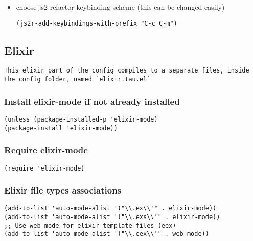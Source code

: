 \documentclass[11pt]{article}
\begin{document}
\begin{itemize}
\item choose js2-refactor keybinding scheme (this can be changed easily)
\label{sec:orgf7a49f5}

\begin{verbatim}
(js2r-add-keybindings-with-prefix "C-c C-m")
\end{verbatim}
\end{itemize}

\subsection*{Elixir}
\label{sec:orgfc30dfa}

\begin{verbatim}
This elixir part of the config compiles to a separate files, inside the config folder, named `elixir.tau.el`
\end{verbatim}

\subsubsection*{Install elixir-mode if not already installed}
\label{sec:org9daae4d}

\begin{verbatim}
(unless (package-installed-p 'elixir-mode)
(package-install 'elixir-mode))  
\end{verbatim}

\subsubsection*{Require elixir-mode}
\label{sec:org695eb38}

\begin{verbatim}
(require 'elixir-mode)
\end{verbatim}

\subsubsection*{Elixir file types associations}
\label{sec:orgb6a5f4b}
\begin{verbatim}
(add-to-list 'auto-mode-alist '("\\.ex\\'" . elixir-mode))
(add-to-list 'auto-mode-alist '("\\.exs\\'" . elixir-mode))
;; Use web-mode for elixir template files (eex)
(add-to-list 'auto-mode-alist '("\\.eex\\'" . web-mode))
\end{verbatim}
\end{document}
